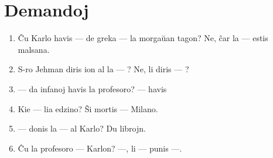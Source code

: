 \newpage

\section*{Demandoj}

\begin{enumerate}
    \item  Ĉu Karlo havis — de greka — la morgaŭan tagon? Ne, ĉar la — estis malsana.
    \item  S-ro Jehman diris ion al la — ? Ne, li diris — ?
    \item  — da infanoj havis la profesoro? — havis
    \item  Kie — lia edzino? Ŝi mortis — Milano.
    \item  — donis la — al Karlo? Du librojn.
    \item  Ĉu la profesoro — Karlon? —, li — punis —.
\end{enumerate}
